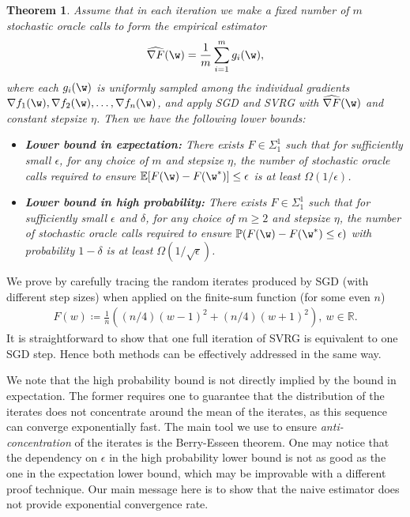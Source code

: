 \documentclass{article}
\theoremstyle{definition}  \newtheorem{exercise}{Exercise}
\theoremstyle{plain}
\newcommand{\pref}[1]{\prettyref{#1}}
\newcommand{\EE}{\mathbb{E}}
\newcommand{\RR}{\mathbb{R}}
\newcommand{\PP}{\mathbb{P}}
\newcommand{\defeq}{\coloneqq}
\newtheorem{thm}{Theorem}
\theoremstyle{definition}
\theoremstyle{remark}
\begin{document}
	
	\begin{thm}\label{thm:naive estimator}
	Assume that in each iteration we make a fixed number of $m$
	stochastic oracle calls to form the empirical estimator
	\[ \widehat{\nabla F}(\w) = \frac{1}{m} \sum_{i=1}^{m} g_i(\w), \]
	where each $g_i(\w)$ is uniformly sampled among the individual gradients 
	$\nabla f_1(\w), \nabla f_2(\w), \dotsc, \nabla f_n(\w)$, and apply SGD and 
	SVRG with $\widehat{\nabla F}(\w)$ and constant stepsize $\eta$. Then we have the following lower bounds:
	\begin{itemize}[leftmargin=1em]
	    \item {\bf Lower bound in expectation:} There exists $F \in \Sigma_1^1$ 
	    such that for sufficiently small $\epsilon$, for any choice of $m$ and stepsize $\eta$, the number of 
	    stochastic oracle calls required to ensure $\EE[ F(\w) - F(\w^*)] \le 
	    \epsilon$ is at least $\Omega(1/\epsilon)$. 
\item {\bf Lower bound in high probability:} There exists $F \in 
	    \Sigma_1^1$ such that for sufficiently small $\epsilon$ and $\delta$, for any choice of $m \ge 2$ and stepsize $\eta$, the 
	    number of stochastic oracle calls required to ensure $\PP(F(\w) - 
	    F(\w^*) \le   \epsilon)$ with probability $1-\delta$ is at least 
	    $\Omega(1/\sqrt{\epsilon})$. 
\end{itemize}
	\end{thm}
	We prove \pref{thm:naive estimator} by carefully tracing the random 
	iterates produced by SGD (with different step sizes) when applied on the 
	finite-sum function (for some even $n$)
	\begin{align*}
		F(w) \defeq   \frac{1}{n}((n/4)(w-1)^2+ 
		(n/4)(w+1)^2), ~w\in\RR.
\end{align*}
	It is straightforward to show that one full iteration of SVRG is equivalent 
	to one SGD step. Hence both methods can be effectively addressed in the 
	same way.

	 
	We note that the high probability bound is not directly implied by the 
	bound in expectation. The former requires one to guarantee that the 
	distribution of the iterates does not concentrate around the mean of the 
	iterates, as this sequence can converge exponentially fast. The main tool 
	we use to ensure \emph{anti-concentration} of the iterates is the Berry-Esseen 
	theorem. One may notice that the dependency on $\epsilon$ in the high probability lower bound is not as good as the one in the expectation lower bound, which may be improvable with a different proof technique.  Our main message here is 
to show that the naive estimator does not provide exponential convergence rate. 
\end{document}
